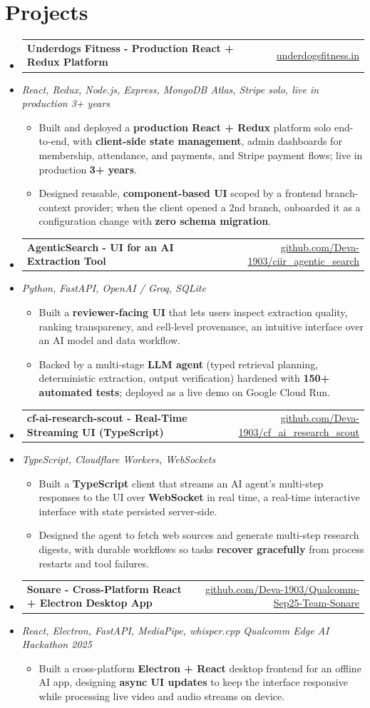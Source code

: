 \documentclass[letterpaper,10pt]{article}
\makeatletter
\newcommand{\resumeItem}[1]{
  \item\small{#1\vspace{-1pt}}
}
\newcommand{\resumeProjectHeading}[2]{
    \item
    \begin{tabular*}{0.985\textwidth}[t]{l@{\extracolsep{\fill}}r}
      \small\textbf{#1} & \small #2 \\
    \end{tabular*}\vspace{-5pt}
}
\newcommand{\resumeProjectSubheading}[1]{
  \vspace{-2pt}\item[] {\small\textcolor{ResumeSlate}{\emph{#1}}}\vspace{-3pt}
}
\newcommand{\resumeSubHeadingListStart}{\begin{itemize}[leftmargin=0.0in, label={}, itemsep=2pt, topsep=2pt]}
\newcommand{\resumeSubHeadingListEnd}{\end{itemize}}
\newcommand{\resumeItemListStart}{\begin{itemize}[leftmargin=0.18in, itemsep=2pt, topsep=1pt]}
\newcommand{\resumeItemListEnd}{\end{itemize}\vspace{-4pt}}
\makeatother
\begin{document}
\section{Projects}
\resumeSubHeadingListStart
  \resumeProjectHeading
    {Underdogs Fitness - Production React + Redux Platform}
    {\href{https://www.underdogsfitness.in/}{underdogsfitness.in}}
  \resumeProjectSubheading{React, Redux, Node.js, Express, MongoDB Atlas, Stripe \enspace\textbar\enspace solo, live in production 3+ years}
    \resumeItemListStart
      \resumeItem{Built and deployed a \textbf{production React + Redux} platform solo end-to-end, with \textbf{client-side state management}, admin dashboards for membership, attendance, and payments, and Stripe payment flows; live in production \textbf{3+ years}.}
      \resumeItem{Designed reusable, \textbf{component-based UI} scoped by a frontend branch-context provider; when the client opened a 2nd branch, onboarded it as a configuration change with \textbf{zero schema migration}.}
    \resumeItemListEnd
  \resumeProjectHeading
    {AgenticSearch - UI for an AI Extraction Tool}
    {\href{https://github.com/Deva-1903/ciir_agentic_search}{github.com/Deva-1903/ciir\_agentic\_search}}
  \resumeProjectSubheading{Python, FastAPI, OpenAI / Groq, SQLite}
    \resumeItemListStart
      \resumeItem{Built a \textbf{reviewer-facing UI} that lets users inspect extraction quality, ranking transparency, and cell-level provenance, an intuitive interface over an AI model and data workflow.}
      \resumeItem{Backed by a multi-stage \textbf{LLM agent} (typed retrieval planning, deterministic extraction, output verification) hardened with \textbf{150+ automated tests}; deployed as a live demo on Google Cloud Run.}
    \resumeItemListEnd
  \resumeProjectHeading
    {cf-ai-research-scout - Real-Time Streaming UI (TypeScript)}
    {\href{https://github.com/Deva-1903/cf_ai_research_scout}{github.com/Deva-1903/cf\_ai\_research\_scout}}
  \resumeProjectSubheading{TypeScript, Cloudflare Workers, WebSockets}
    \resumeItemListStart
      \resumeItem{Built a \textbf{TypeScript} client that streams an AI agent's multi-step responses to the UI over \textbf{WebSocket} in real time, a real-time interactive interface with state persisted server-side.}
      \resumeItem{Designed the agent to fetch web sources and generate multi-step research digests, with durable workflows so tasks \textbf{recover gracefully} from process restarts and tool failures.}
    \resumeItemListEnd
  \resumeProjectHeading
    {Sonare - Cross-Platform React + Electron Desktop App}
    {\href{https://github.com/Deva-1903/Qualcomm-Sep25-Team-Sonare}{github.com/Deva-1903/Qualcomm-Sep25-Team-Sonare}}
  \resumeProjectSubheading{React, Electron, FastAPI, MediaPipe, whisper.cpp \enspace\textbar\enspace Qualcomm Edge AI Hackathon 2025}
    \resumeItemListStart
      \resumeItem{Built a cross-platform \textbf{Electron + React} desktop frontend for an offline AI app, designing \textbf{async UI updates} to keep the interface responsive while processing live video and audio streams on device.}
    \resumeItemListEnd
\resumeSubHeadingListEnd
\vspace{-4pt}
\end{document}
